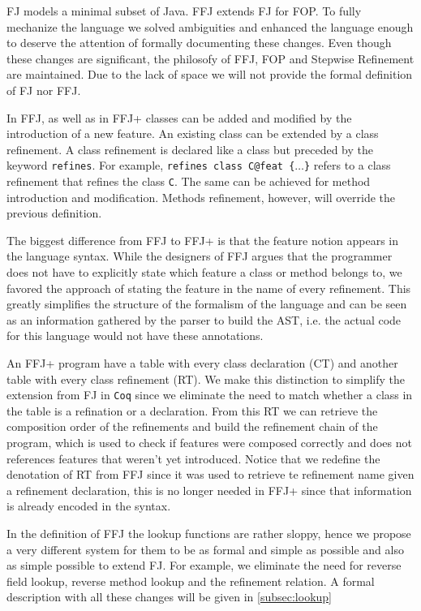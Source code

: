 \ac{FJ} models a minimal subset of Java. \ac{FFJ} extends \ac{FJ} for \ac{FOP}.
To fully mechanize the language we solved ambiguities and enhanced the language enough
to deserve the attention of formally documenting these changes. 
Even though these changes are significant, the philosofy of \ac{FFJ}, \ac{FOP} and Stepwise Refinement are maintained.
Due to the lack of space we will not provide the formal definition of \ac{FJ} nor \ac{FFJ}.

In \ac{FFJ}, as well as in \ac{FFJ+} classes can be added and modified by the introduction of a new feature.
An existing class can be extended by a class refinement. A class refinement is declared like a class but
preceded by the keyword \texttt{refines}. For example, \texttt{refines class C@feat \{$\dots$\}} refers to a class refinement that
refines the class \texttt{C}. The same can be achieved for method introduction and modification. Methods refinement,
however, will override the previous definition.

The biggest difference from \ac{FFJ} to \ac{FFJ+} is that the feature notion appears in the language syntax.
While the designers of \ac{FFJ} argues that the programmer does not have to explicitly state which
feature a class or method belongs to, we favored the approach of stating the feature in the name of every refinement.
This greatly simplifies the structure of the formalism of the language and can be seen as an information gathered
by the parser to build the AST, i.e. the actual code for this language would not have these annotations.

An \ac{FFJ+} program have a table with every class declaration (\textsf{CT}) and another table with every class refinement (\textsf{RT}).
We make this distinction to simplify the extension from \ac{FJ} in \texttt{Coq} since we eliminate the need
to match whether a class in the table is a refination or a declaration. From this \textsf{RT} we can retrieve the composition order
of the refinements and build the refinement chain of the program, which is used to check if features were composed correctly and
does not references features that weren't yet introduced. Notice that we redefine the denotation of \textsf{RT} from \ac{FFJ}
since it was used to retrieve te refinement name given a refinement declaration, this is no longer needed in \ac{FFJ+} since
that information is already encoded in the syntax.

In the definition of \ac{FFJ} the lookup functions are rather sloppy, hence we propose a very different system
for them to be as formal and simple as possible and also as simple possible to extend \ac{FJ}. 
For example, we eliminate the need for reverse field lookup, reverse method lookup and the refinement relation.
A formal description with all these changes will be given in \ref{subsec:lookup}


